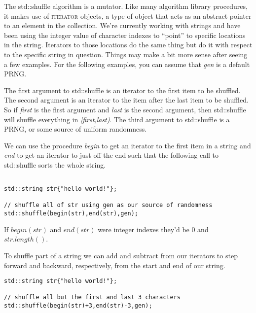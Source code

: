 \documentclass[]{tufte-handout}
\begin{document}
The std::shuffle algorithm is a mutator.  Like many algorithm library procedures, it makes use of \textsc{iterator} objects, a type of object that acts as an abstract pointer to an element in the collection. We're currently working with strings and have been using the integer value of character indexes to ``point'' to specific locations in the string. Iterators to those locations do the same thing but do it with respect to the specific string in question. Things may make a bit more sense after seeing a few examples. For the following examples, you can assume that \textit{gen} is a default PRNG.

The first argument to std::shuffle is an iterator to the first item to be shuffled. The second argument is an iterator to the item after the last item to be shuffled. So if \textit{first} is the first argument and \textit{last} is the second argument, then std::shuffle will shuffle everything in \textit{[first,last)}. The third argument to std::shuffle is a PRNG, or some source of uniform randomness.

We can use the procedure \textit{begin} to get an iterator to the first item in a string and \textit{end} to get an iterator to just off the end such that the following call to std::shuffle sorts the whole string.
\begin{verbatim}

std::string str{"hello world!"};

// shuffle all of str using gen as our source of randomness	
std::shuffle(begin(str),end(str),gen);
\end{verbatim}
If $begin(str)$ and $end(str)$ were integer indexes they'd be $0$ and $str.length()$.


To shuffle part of a string we can add and subtract from our iterators to step forward and backward, respectively, from the start and end of our string.  
\begin{verbatim}
std::string str{"hello world!"};

// shuffle all but the first and last 3 characters
std::shuffle(begin(str)+3,end(str)-3,gen);
\end{verbatim}


\end{document}
